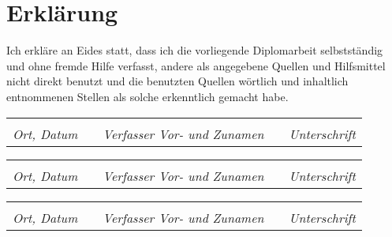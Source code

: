 

\chapter*{Erklärung}



Ich erkläre an Eides statt, dass ich die vorliegende Diplomarbeit selbstständig und ohne fremde Hilfe verfasst, andere als angegebene Quellen und Hilfsmittel nicht direkt benutzt und die benutzten Quellen wörtlich und inhaltlich entnommenen Stellen als solche erkenntlich gemacht habe.
\vspace{3cm}

\iffabian
\begin{tabularx}{1\textwidth}{X p{1cm} X p{1cm} X}
\hrulefill & & \hrulefill & & \hrulefill \\
\emph{Ort, Datum} & & \emph{Verfasser Vor- und Zunamen} & & \emph{Unterschrift}
\end{tabularx}
\fi



\ifthomas
\begin{tabularx}{1\textwidth}{X p{1cm} X p{1cm} X}
\hrulefill & & \hrulefill & & \hrulefill \\
\emph{Ort, Datum} & & \emph{Verfasser Vor- und Zunamen} & & \emph{Unterschrift}
\end{tabularx}
\fi

\ifpeter
\begin{tabularx}{1\textwidth}{X p{1cm} X p{1cm} X}
\hrulefill & & \hrulefill & & \hrulefill \\
\emph{Ort, Datum} & & \emph{Verfasser Vor- und Zunamen} & & \emph{Unterschrift}
\end{tabularx}
\fi


